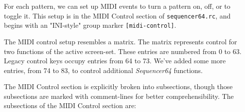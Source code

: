    For each pattern, we can set up MIDI events to turn a 
   pattern on, off, or to toggle it.  This setup is in the 
   MIDI Control section of \texttt{sequencer64.rc}, and begins with an
   "INI-style" group marker \texttt{[midi-control]}.


   The MIDI control setup resembles a matrix.
   The matrix represents control for two functions of the active screen-set.
   These entries are numbered from 0 to 63.
   Legacy control keys occupy entries from 64 to 73.
   We've added some more entries, from 74 to 83, to control additional
   \textsl{Sequencer64} functions.
   
   The MIDI Control section is explicitly broken into subsections, though those
   subsections are marked with comment-lines for better comprehensibility.  The
   subsections of the MIDI Control section are:

